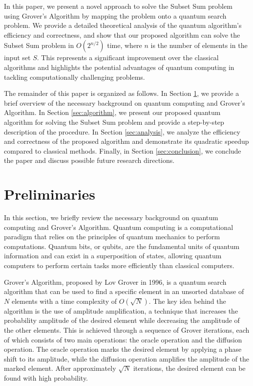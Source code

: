 In this paper, we present a novel approach to solve the Subset Sum problem using Grover's Algorithm by mapping the problem onto a quantum search problem. We provide a detailed theoretical analysis of the quantum algorithm's efficiency and correctness, and show that our proposed algorithm can solve the Subset Sum problem in $O\left(2^{n/2}\right)$ time, where $n$ is the number of elements in the input set $S$. This represents a significant improvement over the classical algorithms and highlights the potential advantages of quantum computing in tackling computationally challenging problems.

The remainder of this paper is organized as follows. In Section \ref{sec:preliminaries}, we provide a brief overview of the necessary background on quantum computing and Grover's Algorithm. In Section \ref{sec:algorithm}, we present our proposed quantum algorithm for solving the Subset Sum problem and provide a step-by-step description of the procedure. In Section \ref{sec:analysis}, we analyze the efficiency and correctness of the proposed algorithm and demonstrate its quadratic speedup compared to classical methods. Finally, in Section \ref{sec:conclusion}, we conclude the paper and discuss possible future research directions.

\section{Preliminaries}\label{sec:preliminaries}
In this section, we briefly review the necessary background on quantum computing and Grover's Algorithm. Quantum computing is a computational paradigm that relies on the principles of quantum mechanics to perform computations. Quantum bits, or qubits, are the fundamental units of quantum information and can exist in a superposition of states, allowing quantum computers to perform certain tasks more efficiently than classical computers.

Grover's Algorithm, proposed by Lov Grover in 1996, is a quantum search algorithm that can be used to find a specific element in an unsorted database of $N$ elements with a time complexity of $O\left(\sqrt{N}\right)$. The key idea behind the algorithm is the use of amplitude amplification, a technique that increases the probability amplitude of the desired element while decreasing the amplitude of the other elements. This is achieved through a sequence of Grover iterations, each of which consists of two main operations: the oracle operation and the diffusion operation. The oracle operation marks the desired element by applying a phase shift to its amplitude, while the diffusion operation amplifies the amplitude of the marked element. After approximately $\sqrt{N}$ iterations, the desired element can be found with high probability.



